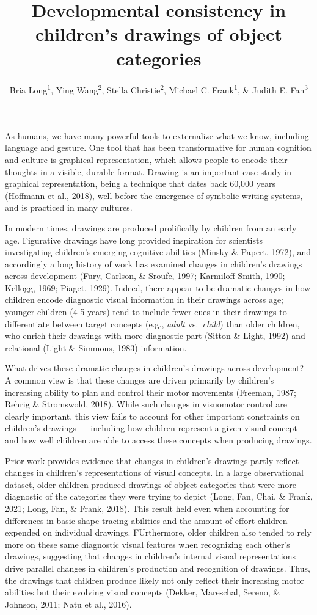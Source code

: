 \documentclass[
  english,
  man]{apa6}
\author{Bria Long\textsuperscript{1}, Ying Wang\textsuperscript{2}, Stella Christie\textsuperscript{2}, Michael C. Frank\textsuperscript{1}, \& Judith E. Fan\textsuperscript{3}}
\affiliation{
\vspace{0.5cm}
\textsuperscript{1} Stanford University\\\textsuperscript{2} Tsinghua University\\\textsuperscript{3} University of California, San Diego}
\title{Developmental consistency in children's drawings of object categories}
\date{}
\begin{document}
\maketitle

As humans, we have many powerful tools to externalize what we know, including language and gesture.
One tool that has been transformative for human cognition and culture is graphical representation, which allows people to encode their thoughts in a visible, durable format.
Drawing is an important case study in graphical representation, being a technique that dates back 60,000 years (Hoffmann et al., 2018), well before the emergence of symbolic writing systems, and is practiced in many cultures.

In modern times, drawings are produced prolifically by children from an early age.
Figurative drawings have long provided inspiration for scientists investigating children's emerging cognitive abilities (Minsky \& Papert, 1972), and accordingly a long history of work has examined changes in children's drawings across development (Fury, Carlson, \& Sroufe, 1997; Karmiloff-Smith, 1990; Kellogg, 1969; Piaget, 1929).
Indeed, there appear to be dramatic changes in how children encode diagnostic visual information in their drawings across age; younger children (4-5 years) tend to include fewer cues in their drawings to differentiate between target concepts (e.g., \textit{adult} vs.~\textit{child}) than older children, who enrich their drawings with more diagnostic part (Sitton \& Light, 1992) and relational (Light \& Simmons, 1983) information.

What drives these dramatic changes in children's drawings across development?
A common view is that these changes are driven primarily by children's increasing ability to plan and control their motor movements (Freeman, 1987; Rehrig \& Stromswold, 2018).
While such changes in visuomotor control are clearly important, this view fails to account for other important constraints on children's drawings --- including how children represent a given visual concept and how well children are able to access these concepts when producing drawings.

Prior work provides evidence that changes in children's drawings partly reflect changes in children's representations of visual concepts. In a large observational dataset, older children produced drawings of object categories that were more diagnostic of the categories they were trying to depict (Long, Fan, Chai, \& Frank, 2021; Long, Fan, \& Frank, 2018). This result held even when accounting for differences in basic shape tracing abilities and the amount of effort children expended on individual drawings. FUrthermore, older children also tended to rely more on these same diagnostic visual features when recognizing each other's drawings, suggesting that changes in children's internal visual representations drive parallel changes in children's production and recognition of drawings. Thus, the drawings that children produce likely not only reflect their increasing motor abilities but their evolving visual concepts (Dekker, Mareschal, Sereno, \& Johnson, 2011; Natu et al., 2016).
\end{document}
